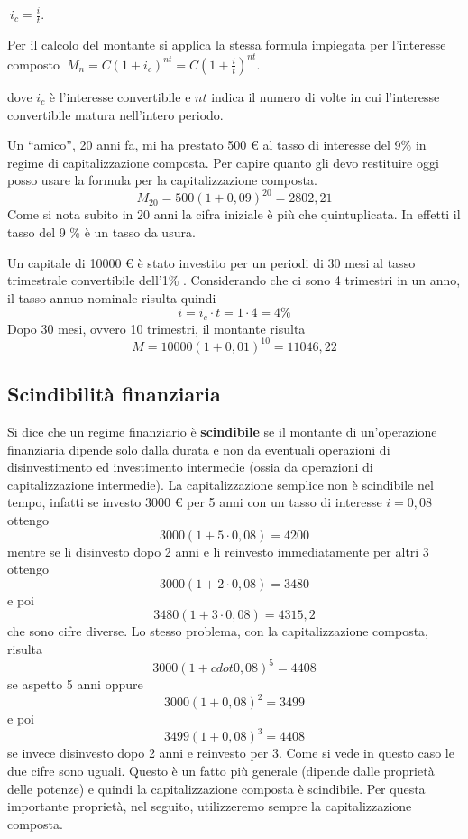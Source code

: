 \(\ i_c = \frac{i}{t}\).

Per il calcolo del montante si applica la stessa formula impiegata per 
l'interesse composto
\(\ M_n = C (1+i_c)^{nt} = C \left(1+\frac{i}{t}\right)^{nt}\).

dove \(i_c\) è l'interesse convertibile e \(nt\) indica il numero di volte in 
cui l'interesse convertibile matura nell'intero periodo.

\begin{exrig}
\begin{esempio}
Un ``amico'', 20 anni fa, mi ha prestato 500 € al tasso di interesse del 
9\% in regime di capitalizzazione composta. Per capire quanto gli devo 
restituire oggi posso usare la formula per la capitalizzazione composta.
\[M_{20} = 500(1+0,09)^{20} = 2802,21\] 
Come si nota subito in 20 anni la cifra iniziale è più che quintuplicata. 
In effetti il tasso del 9 \% è un tasso da usura. 
\end{esempio}
\begin{esempio}
Un capitale di 10000 € è stato investito per un periodi di 30 mesi al tasso 
trimestrale convertibile dell'1\% . Considerando che ci sono 4 trimestri in 
un anno, il tasso annuo nominale risulta quindi
\[i=i_c\cdot t=1\cdot 4=4\%\]
Dopo 30 mesi, ovvero 10 trimestri, il montante risulta
\[M=10000(1+0,01)^{10}=11046,22\]
\end{esempio}
\end{exrig}

\subsection{Scindibilità finanziaria}
Si dice che un regime finanziario è \textbf{scindibile} se il montante di 
un'operazione finanziaria dipende solo dalla durata e non da eventuali 
operazioni di disinvestimento ed investimento intermedie (ossia da 
operazioni di capitalizzazione intermedie).
La capitalizzazione semplice non è scindibile nel tempo, infatti se investo 
3000 € per 5 anni con un tasso di interesse \(i=0,08\) ottengo
\[3000(1+5\cdot0,08)=4200\]
mentre se li disinvesto dopo 2 anni e li reinvesto immediatamente per altri 
3 ottengo
\[3000(1+2\cdot0,08)=3480\] 
e poi
\[3480(1+3\cdot0,08)=4315,2\] 
che sono cifre diverse.
Lo stesso problema, con la capitalizzazione composta, risulta
\[3000(1+cdot0,08)^5=4408\] 
se aspetto 5 anni oppure
\[3000(1+0,08)^2=3499\] 
e poi
\[3499(1+0,08)^3=4408\] 
se invece disinvesto dopo 2 anni e reinvesto per 3.
Come si vede in questo caso le due cifre sono uguali. Questo è un fatto più 
generale (dipende dalle proprietà delle potenze) e quindi la 
capitalizzazione composta è scindibile. Per questa importante proprietà, 
nel seguito, utilizzeremo sempre la capitalizzazione composta.

